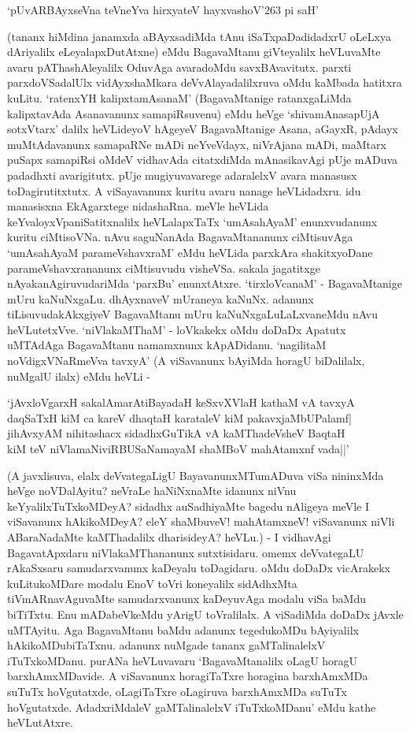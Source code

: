 \begin{shloka}
`pUvARBAyxseVna teVneYva hirxyateV hayxvashoV\char'263 pi saH'
\end{shloka}

(tananx hiMdina janamxda aBAyxsadiMda tAnu iSaTxpaDadidadxrU oLeLxya dAriyalilx eLeyalapxDutAtxne) eMdu BagavaMtanu giVteyalilx heVLuvaMte avaru pAThashAleyalilx OduvAga avaradoMdu savxBAvavitutx. parxti parxdoVSadalUlx vidAyxshaMkara deVvAlayadalilxruva oMdu kaMbada hatitxra kuLitu. `ratenxYH kalipxtamAsanaM' (BagavaMtanige ratanxgaLiMda kalipxtavAda Asanavanunx samapiRsuvenu) eMdu heVge `shivamAnasapUjA sotxVtarx' dalilx heVLideyoV hAgeyeV BagavaMtanige Asana, aGayxR, pAdayx muMtAdavanunx samapaRNe mADi neYveVdayx, niVrAjana mADi, maMtarx puSapx samapiRsi oMdeV vidhavAda citatxdiMda mAnasikavAgi pUje mADuva padadhxti avarigitutx. pUje mugiyuvavarege adaralelxV avara manasusx toDagirutitxtutx. A viSayavanunx kuritu avaru nanage heVLidadxru. idu manasisxna EkAgarxtege nidashaRna. meVle heVLida keYvaloyxVpaniSatitxnalilx heVLalapxTaTx `umAsahAyaM' enunxvudanunx kuritu ciMtisoVNa. nAvu saguNanAda BagavaMtananunx ciMtisuvAga `umAsahAyaM parameVshavxraM' eMdu heVLida parxkAra shakitxyoDane parameVshavxrananunx ciMtisuvudu visheVSa. sakala jagatitxge nAyakanAgiruvudariMda `parxBu' enunxtAtxre. `tirxloVcanaM' - BagavaMtanige mUru kaNuNxgaLu. dhAyxnaveV mUraneya kaNuNx. adanunx tiLisuvudakAkxgiyeV BagavaMtanu mUru kaNuNxgaLuLaLxvaneMdu nAvu heVLutetxVve. `niVlakaMThaM' - loVkakekx oMdu doDaDx Apatutx uMTAdAga BagavaMtanu namamxnunx kApADidanu. `nagilitaM noVdigxVNaRmeVva tavxyA' (A viSavanunx bAyiMda horagU biDalilalx, nuMgalU ilalx) eMdu heVLi - 

\begin{shloka}
`jAvxloVgarxH sakalAmarAtiBayadaH keSxvXVlaH kathaM vA tavxyA\\
daqSaTxH kiM ca kareV dhaqtaH karataleV kiM pakavxjaMbUPalamf|\\
jihAvxyAM nihitashacx sidadhxGuTikA vA kaMThadeVsheV BaqtaH\\
kiM teV niVlamaNiviRBUSaNamayaM shaMBoV mahAtamxnf vada||'
\end{shloka}

(A javxlisuva, elalx deVvategaLigU BayavanunxMTumADuva viSa nininxMda heVge noVDalAyitu? neVraLe haNiNxnaMte idanunx niVnu keYyalilxTuTxkoMDeyA? sidadhx auSadhiyaMte bagedu nAligeya meVle I viSavanunx hAkikoMDeyA? eleY shaMbuveV! mahAtamxneV! viSavanunx niVli ABaraNadaMte kaMThadalilx dharisideyA? heVLu.) - I vidhavAgi BagavatApxdaru niVlakaMThananunx sutxtisidaru. omemx deVvategaLU rAkaSxsaru samudarxvanunx kaDeyalu toDagidaru. oMdu doDaDx vicArakekx kuLitukoMDare modalu EnoV toVri koneyalilx sidAdhxMta tiVmARnavAguvaMte samudarxvanunx kaDeyuvAga modalu viSa baMdu biTiTxtu. Enu mADabeVkeMdu yArigU toVralilalx. A viSadiMda doDaDx jAvxle uMTAyitu. Aga BagavaMtanu baMdu adanunx tegedukoMDu bAyiyalilx hAkikoMDubiTaTxnu. adanunx nuMgade tananx gaMTalinalelxV iTuTxkoMDanu. purANa heVLuvavaru `BagavaMtanalilx oLagU horagU barxhAmxMDavide. A viSavanunx horagiTaTxre horagina barxhAmxMDa suTuTx hoVgutatxde, oLagiTaTxre oLagiruva barxhAmxMDa suTuTx hoVgutatxde. AdadxriMdaleV gaMTalinalelxV iTuTxkoMDanu' eMdu kathe heVLutAtxre.

